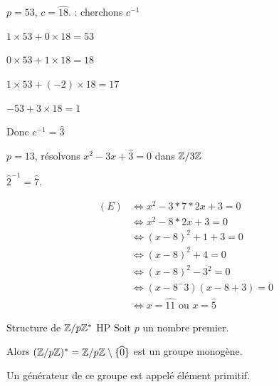 \begin{exemple}
    $p = 53$, $c = \widehat{18}$. : cherchons $c^{-1}$

    $1\times 53 + 0 \times 18 = 53$
    
    $0 \times 53 + 1 \times 18 = 18$

    $1 \times 53 + (-2) \times 18 = 17$

    $- 53 + 3 \times 18 = 1$ 

    Donc $c^{-1} = \widehat{3} $

    \lvspace $p = 13$, résolvons $x^2 - 3x + \widehat 3 = 0$ dans $\mathbb{Z}/3\mathbb{Z}$

    $\widehat 2^{-1} = \widehat 7$. 

    \begin{align*}
        (E) & \Leftrightarrow x^2 - 3 *7*2x + 3 = 0 \\
        & \Leftrightarrow x^2 - 8 * 2x + 3 = 0 \\
        & \Leftrightarrow (x - 8)^2 + 1 + 3 = 0 \\
        & \Leftrightarrow (x - 8)^2 + 4 = 0 \\
        & \Leftrightarrow (x - 8)^2 - 3^2 = 0 \\
        & \Leftrightarrow (x - 8^- 3)(x - 8 + 3) = 0 \\
        & \Leftrightarrow x = \widehat {11} \text{ ou } x = \widehat {5}
    \end{align*}
\end{exemple}

\begin{theoreme}{Structure de $\mathbb{Z}/p\mathbb{Z} ^*$ HP}{}
    Soit $p$ un nombre premier. 

    Alors $(\mathbb{Z}/p\mathbb{Z})^* = \mathbb{Z}/p\mathbb{Z} \setminus \{\widehat 0\}$ est un groupe monogène. 

    Un générateur de ce groupe est appelé élément primitif. 
\end{theoreme}

